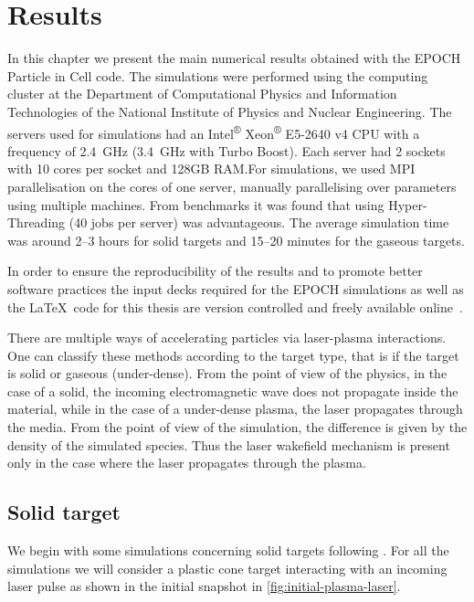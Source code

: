 \documentclass[12pt, class=report, crop=false]{standalone}
\begin{document}
\chapter{Results}%
\label{chap:results}

In this chapter we present the main numerical results obtained with the EPOCH
Particle in Cell code. The simulations were performed using the computing cluster
at the Department of Computational Physics and Information
Technologies of the National Institute of Physics and Nuclear Engineering.
The servers used for simulations had an Intel\textsuperscript{®} Xeon\textsuperscript{®}
E5-2640 v4 CPU with a frequency of \SI{2.4}{\giga\hertz} (\SI{3.4}{\giga\hertz}
with Turbo Boost). Each server had 2 sockets with 10 cores per socket and
128GB RAM.\@ For simulations, we used MPI parallelisation on the cores of one
server, manually parallelising over parameters using multiple machines.
From benchmarks it was found that using Hyper-Threading (40 jobs per server)
was advantageous. The average simulation time was around 2--3 hours for solid
targets and 15--20 minutes for the gaseous targets.

In order to ensure the reproducibility of the results and to promote better
software practices the input decks required for the EPOCH simulations
as well as the \LaTeX\ code for this thesis are version controlled and
freely available online~\autocite{micluta-campeanu_sebastianmcmasterthesis_2019}.

There are multiple ways of accelerating particles via laser-plasma interactions.
One can classify these methods according to the target type, that is if the
target is solid or gaseous (under-dense). From the point of view of the physics, in the
case of a solid, the incoming electromagnetic wave does not propagate inside
the material, while in the case of a under-dense plasma, the laser propagates
through the media. From the point of view of the simulation, the difference is
given by the density of the simulated species. Thus the laser wakefield mechanism
is present only in the case where the laser propagates through the plasma.

\section{Solid target}

We begin with some simulations concerning solid targets following
\textcite{budriga_modelingultrahigh_2017}. For all the simulations we will consider
a plastic cone target interacting with an incoming laser pulse as shown in the
initial snapshot in \cref{fig:initial-plasma-laser}.
\end{document}
